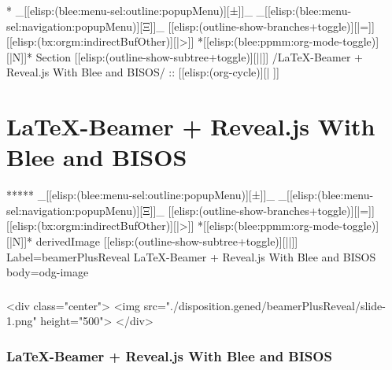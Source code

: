 \begin{whenOrg}
\begin{whenOrg}
*  _[[elisp:(blee:menu-sel:outline:popupMenu)][±]]_ _[[elisp:(blee:menu-sel:navigation:popupMenu)][Ξ]]_ [[elisp:(outline-show-branches+toggle)][|=]] [[elisp:(bx:orgm:indirectBufOther)][|>]] *[[elisp:(blee:ppmm:org-mode-toggle)][|N]]*  Section    [[elisp:(outline-show-subtree+toggle)][||]]   /LaTeX-Beamer + Reveal.js With Blee and BISOS/ ::  [[elisp:(org-cycle)][| ]]
\end{whenOrg}

\section{LaTeX-Beamer + Reveal.js With Blee and BISOS}


\begin{whenOrg}
*****  _[[elisp:(blee:menu-sel:outline:popupMenu)][±]]_ _[[elisp:(blee:menu-sel:navigation:popupMenu)][Ξ]]_ [[elisp:(outline-show-branches+toggle)][|=]] [[elisp:(bx:orgm:indirectBufOther)][|>]] *[[elisp:(blee:ppmm:org-mode-toggle)][|N]]*  derivedImage [[elisp:(outline-show-subtree+toggle)][||]] Label=beamerPlusReveal LaTeX-Beamer + Reveal.js With Blee and BISOS body=odg-image
\end{whenOrg}

\begin{htmlonly}

\begin{frame}[fragile,plain,label=beamerPlusReveal]
    \frametitle{}
    \framesubtitle{}
    \begin{rawhtml}
<div class="center">
<img src="./disposition.gened/beamerPlusReveal/slide-1.png" height="500">
</div>
    \end{rawhtml}
\end{frame}
\end{htmlonly}

\begin{verblatex}

\begin{frame}[fragile,plain,label=beamerPlusReveal]
    \frametitle{LaTeX-Beamer + Reveal.js With Blee and BISOS}
    \framesubtitle{}



\end{frame}
\end{verblatex}
\end{whenOrg}
